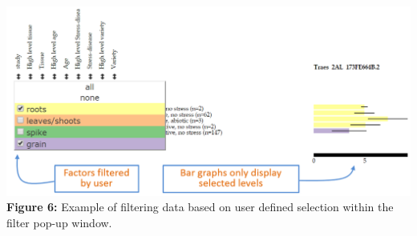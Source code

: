 \includegraphics{images/Figure5.png} \textbf{Figure 6:} Example of
filtering data based on user defined selection within the filter pop-up
window.
